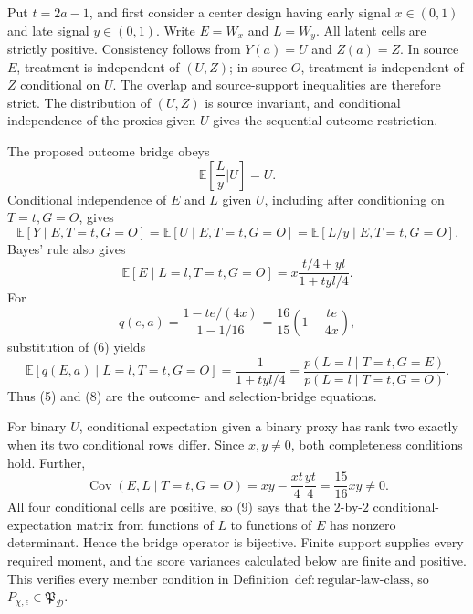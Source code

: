 Put \(t=2a-1\), and first consider a center design having early signal \(x\in(0,1)\) and late signal \(y\in(0,1)\). Write \(E=W_x\) and \(L=W_y\). All latent cells are strictly positive. Consistency follows from \(Y(a)=U\) and \(Z(a)=Z\). In source \(E\), treatment is independent of \((U,Z)\); in source \(O\), treatment is independent of \(Z\) conditional on \(U\). The overlap and source-support inequalities are therefore strict. The distribution of \((U,Z)\) is source invariant, and conditional independence of the proxies given \(U\) gives the sequential-outcome restriction.

The proposed outcome bridge obeys
\[
 \mathbb E\!\left[\frac{L}{y}\mathrel{\Big|}U\right]=U.
\]
Conditional independence of \(E\) and \(L\) given \(U\), including after conditioning on \(T=t,G=O\), gives
\[
 \mathbb E[Y\mid E,T=t,G=O]
 =\mathbb E[U\mid E,T=t,G=O]
 =\mathbb E[L/y\mid E,T=t,G=O].                         \tag{5}
\]
Bayes' rule also gives
\[
 \mathbb E[E\mid L=l,T=t,G=O]
 =x\frac{t/4+yl}{1+tyl/4}.                              \tag{6}
\]
For
\[
 q(e,a)=\frac{1-te/(4x)}{1-1/16}
 =\frac{16}{15}\left(1-\frac{te}{4x}\right),           \tag{7}
\]
substitution of (6) yields
\[
 \mathbb E[q(E,a)\mid L=l,T=t,G=O]
 =\frac1{1+tyl/4}
 =\frac{p(L=l\mid T=t,G=E)}{p(L=l\mid T=t,G=O)}.        \tag{8}
\]
Thus (5) and (8) are the outcome- and selection-bridge equations.

For binary \(U\), conditional expectation given a binary proxy has rank two exactly when its two conditional rows differ. Since \(x,y\ne0\), both completeness conditions hold. Further,
\[
\operatorname{Cov}(E,L\mid T=t,G=O)
 =xy-\frac{xt}{4}\frac{yt}{4}=\frac{15}{16}xy\ne0.     \tag{9}
\]
All four conditional cells are positive, so (9) says that the \(2\)-by-\(2\) conditional-expectation matrix from functions of \(L\) to functions of \(E\) has nonzero determinant. Hence the bridge operator is bijective. Finite support supplies every required moment, and the score variances calculated below are finite and positive. This verifies every member condition in Definition~\(\mathrm{def{:}regular\text{-}law\text{-}class}\), so \(P_{\chi,\epsilon}\in\mathfrak P_{\mathcal D}\).

